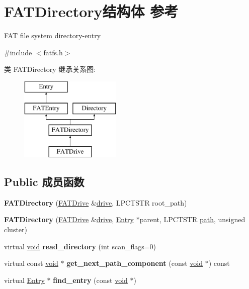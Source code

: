 \hypertarget{struct_f_a_t_directory}{}\section{F\+A\+T\+Directory结构体 参考}
\label{struct_f_a_t_directory}


F\+AT file system directory-\/entry  




{\ttfamily \#include $<$fatfs.\+h$>$}

类 F\+A\+T\+Directory 继承关系图\+:\begin{figure}[H]
\begin{center}
\leavevmode
\includegraphics[height=4.000000cm]{struct_f_a_t_directory}
\end{center}
\end{figure}
\subsection*{Public 成员函数}
\begin{DoxyCompactItemize}
\item 
\mbox{\label{struct_f_a_t_directory_a06462624d57e60b3bc9c41498b477ec1}} 
{\bfseries F\+A\+T\+Directory} (\hyperlink{struct_f_a_t_drive}{F\+A\+T\+Drive} \&\hyperlink{structdrive}{drive}, L\+P\+C\+T\+S\+TR root\+\_\+path)
\item 
\mbox{\label{struct_f_a_t_directory_a1f22d5a2c4742f0892de08a8dcee1470}} 
{\bfseries F\+A\+T\+Directory} (\hyperlink{struct_f_a_t_drive}{F\+A\+T\+Drive} \&\hyperlink{structdrive}{drive}, \hyperlink{struct_entry}{Entry} $\ast$parent, L\+P\+C\+T\+S\+TR \hyperlink{structpath}{path}, unsigned cluster)
\item 
\mbox{\label{struct_f_a_t_directory_a8a737b999773b257e42ba5048f83f51a}} 
virtual \hyperlink{interfacevoid}{void} {\bfseries read\+\_\+directory} (int scan\+\_\+flags=0)
\item 
\mbox{\label{struct_f_a_t_directory_ab3f9d8879f231bec8361a81b2664a057}} 
virtual const \hyperlink{interfacevoid}{void} $\ast$ {\bfseries get\+\_\+next\+\_\+path\+\_\+component} (const \hyperlink{interfacevoid}{void} $\ast$) const
\item 
\mbox{\label{struct_f_a_t_directory_a8812cac16ca5e8ad1426e045444e5bdb}} 
virtual \hyperlink{struct_entry}{Entry} $\ast$ {\bfseries find\+\_\+entry} (const \hyperlink{interfacevoid}{void} $\ast$)
\end{DoxyCompactItemize}
